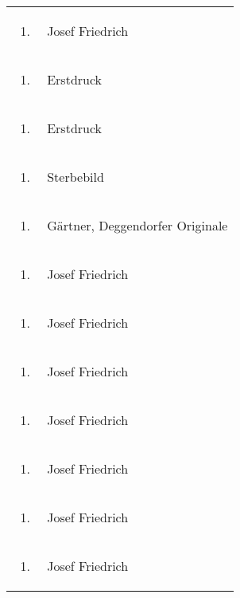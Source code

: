 \begin{flushleft}
\begin{supertabular}{m{1.2409999cm}m{14.604cm}}
\begin{enumerate}
\item
\end{enumerate}
 &
Josef Friedrich\\
\begin{enumerate}
\item
\end{enumerate}
 &
Erstdruck\\
\begin{enumerate}
\item
\end{enumerate}
 &
Erstdruck\\
\begin{enumerate}
\item
\end{enumerate}
 &
Sterbebild\\
\begin{enumerate}
\item
\end{enumerate}
 &
Gärtner, Deggendorfer Originale\\
\begin{enumerate}
\item
\end{enumerate}
 &
Josef Friedrich\\
\begin{enumerate}
\item
\end{enumerate}
 &
Josef Friedrich\\
\begin{enumerate}
\item
\end{enumerate}
 &
Josef Friedrich\\
\begin{enumerate}
\item
\end{enumerate}
 &
Josef Friedrich\\
\begin{enumerate}
\item
\end{enumerate}
 &
Josef Friedrich\\
\begin{enumerate}
\item
\end{enumerate}
 &
Josef Friedrich\\
\begin{enumerate}
\item
\end{enumerate}
 &
Josef Friedrich\\

\end{supertabular}
\end{flushleft}
